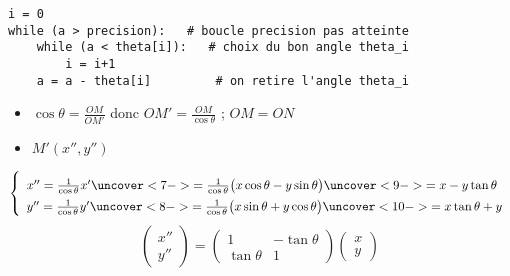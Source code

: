 \begin{frame}[fragile]

\begin{algo}[tangente.py (2)]
\begin{lstlisting}
i = 0
while (a > precision):   # boucle precision pas atteinte
    while (a < theta[i]):   # choix du bon angle theta_i
        i = i+1
    a = a - theta[i]         # on retire l'angle theta_i
\end{lstlisting}  
\end{algo}

\end{frame}


\begin{frame}

\vspace*{-4ex}
\pause
  \begin{itemize}
    \item $\cos \theta = \frac{OM}{OM'}$ \pause \quad donc $OM' = \frac{OM}{\cos \theta}$  \pause \quad ; \quad $OM=ON$
\pause    
    \item $M'(x'',y'')$ 
\end{itemize}
\pause
$$ \left\{ \begin{array}{l} 
        \vphantom{\displaystyle\int}x'' = \frac{1}{\cos \theta} x' 
        \uncover<7->{= \frac{1}{\cos \theta} \big( x \cos \theta - y \sin \theta \big)} 
        \uncover<9->{= x - y \tan \theta} \\
         y'' = \frac{1}{\cos \theta} y' 
         \uncover<8->{= \frac{1}{\cos \theta} \big(x \sin \theta + y \cos \theta \big)} 
         \uncover<10->{= x \tan \theta + y} \\
        \end{array}        
\right. $$ 
\pause\pause\pause\pause\pause
$$\begin{pmatrix} x'' \\ y'' \end{pmatrix}
= \begin{pmatrix} 1 & - \tan \theta \\ \tan \theta & 1 \end{pmatrix}
\begin{pmatrix} x \\y \end{pmatrix}$$
 
\end{frame}




